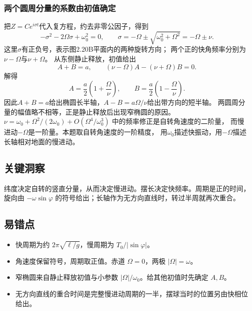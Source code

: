 \documentclass[UTF8,fontset=fandol,a4paper,11pt]{ctexart}
\begin{document}
\subsubsection*{两个圆周分量的系数由初值确定}
把$Z=C e^{i\sigma t}$代入复方程，约去非零公因子，得到
\[
-\sigma^2-2\Omega\sigma+\omega_0^2=0,
\qquad \sigma=-\Omega\pm\sqrt{\omega_0^2+\Omega^2}
=-\Omega\pm\nu.
\]
这里$\sigma$有正负号，表示图2.20B平面内的两种旋转方向；
两个正的快角频率分别为$\nu-\Omega$与$\nu+\Omega$。
从东侧静止释放，初值给出
\[
A+B=a,\qquad (\nu-\Omega)A-(\nu+\Omega)B=0.
\]
解得
\[
A=\frac a2\left(1+\frac\Omega\nu\right),\qquad
B=\frac a2\left(1-\frac\Omega\nu\right).
\]
因此$A+B=a$给出椭圆长半轴，$A-B=a\Omega/\nu$给出带方向的短半轴。
两圆周分量的幅值略不相等，正是静止释放后出现窄椭圆的原因。
$\nu=\omega_0+\Omega^2/(2\omega_0)+O(\Omega^4/\omega_0^3)$
中的频率修正是自转角速度的二阶量，
而慢进动$-\Omega$是一阶量。本题取自转角速度的一阶精度，
用$\omega_0$描述快振动，用$-\Omega$描述长轴相对地面的慢进动。





\subsection*{关键洞察}

纬度决定自转的竖直分量，从而决定慢进动。摆长决定快频率。周期是正的时间，旋向由 $-\omega\sin\varphi$ 的符号给出；长轴作为无方向直线时，转过半周就再次重合。



\subsection*{易错点}

\begin{itemize}
\item 快周期为约 $2\pi\sqrt{\ell/g}$，慢周期为 $T_0/|\sin\varphi|$。
\item 角速度保留符号，周期取正值。赤道 $\Omega=0$，两极 $|\Omega|=\omega$。
\item 窄椭圆来自静止释放初值与小参数 $|\Omega|/\omega_0$。给其他初值时先确定 $A,B$。
\item 无方向直线的重合时间是完整慢进动周期的一半，摆球当时的位置另由快相位给出。
\end{itemize}
\end{document}
